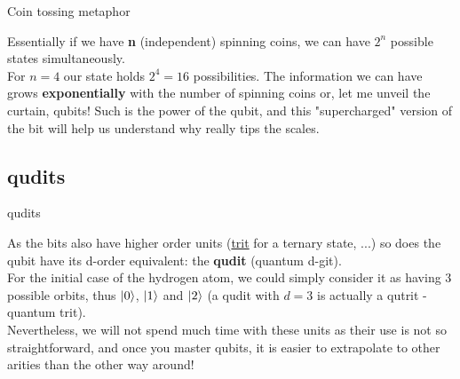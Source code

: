 \documentclass[aspectratio=43]{beamer}
\begin{document}
\begin{frame}{Coin tossing metaphor}
	\begin{card}
		Essentially if we have \textbf{n} (independent) spinning coins, we can have  \textbf{$2^n$} possible states simultaneously.\\
		For $n=4$ our state holds $2^4=16$ possibilities. The information we can have grows \textbf{exponentially} with the number of spinning coins or, let me unveil the curtain, qubits! Such is the power of the qubit, and this "supercharged" version of the bit will help us understand why \qc really tips the scales.
	\end{card}
\pagenumber
\end{frame}

\subsection{qudits}
\begin{frame}{qudits}
    \begin{card}[Curiosity*]
        As the bits also have higher order units (\href{https://en.wikipedia.org/wiki/Ternary_numeral_system}{trit} for a ternary state, ...) so does the qubit have its d-order equivalent: the \textbf{qudit} (quantum d-git).\\
        For the initial case of the hydrogen atom, we could simply consider it as having 3 possible orbits, thus $\ket{0}$, $\ket{1}$ and $\ket{2}$ (a qudit with $d=3$ is actually a qutrit - quantum trit).\\
        Nevertheless, we will not spend much time with these units as their use is not so straightforward, and once you master qubits, it is easier to extrapolate to other arities than the other way around!
    \end{card}
\pagenumber
\end{frame}
\end{document}
